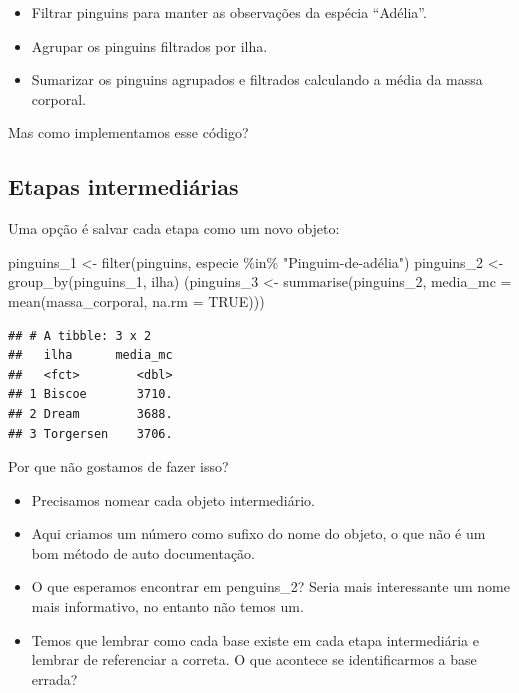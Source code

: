 \documentclass[
]{book}
\newenvironment{Shaded}{\begin{snugshade}}{\end{snugshade}}
\newcommand{\AttributeTok}[1]{\textcolor[rgb]{0.77,0.63,0.00}{#1}}
\newcommand{\ConstantTok}[1]{\textcolor[rgb]{0.00,0.00,0.00}{#1}}
\newcommand{\FunctionTok}[1]{\textcolor[rgb]{0.00,0.00,0.00}{#1}}
\newcommand{\NormalTok}[1]{#1}
\newcommand{\OtherTok}[1]{\textcolor[rgb]{0.56,0.35,0.01}{#1}}
\newcommand{\SpecialCharTok}[1]{\textcolor[rgb]{0.00,0.00,0.00}{#1}}
\newcommand{\StringTok}[1]{\textcolor[rgb]{0.31,0.60,0.02}{#1}}
\providecommand{\tightlist}{%
  \setlength{\itemsep}{0pt}\setlength{\parskip}{0pt}}
\begin{document}
\begin{itemize}
\tightlist
\item
  Filtrar pinguins para manter as observações da espécia ``Adélia''.
\item
  Agrupar os pinguins filtrados por ilha.
\item
  Sumarizar os pinguins agrupados e filtrados calculando a média da massa
  corporal.
\end{itemize}

Mas como implementamos esse código?

\hypertarget{etapas-intermediuxe1rias}{%
\subsection{Etapas intermediárias}\label{etapas-intermediuxe1rias}}

Uma opção é salvar cada etapa como um novo objeto:

\begin{Shaded}
\begin{Highlighting}[]
\NormalTok{pinguins\_1 }\OtherTok{\textless{}{-}} \FunctionTok{filter}\NormalTok{(pinguins, especie }\SpecialCharTok{\%in\%} \StringTok{"Pinguim{-}de{-}adélia"}\NormalTok{)}
\NormalTok{pinguins\_2 }\OtherTok{\textless{}{-}} \FunctionTok{group\_by}\NormalTok{(pinguins\_1, ilha)}
\NormalTok{(pinguins\_3 }\OtherTok{\textless{}{-}} \FunctionTok{summarise}\NormalTok{(pinguins\_2, }\AttributeTok{media\_mc =} \FunctionTok{mean}\NormalTok{(massa\_corporal, }\AttributeTok{na.rm =} \ConstantTok{TRUE}\NormalTok{)))}
\end{Highlighting}
\end{Shaded}

\begin{verbatim}
## # A tibble: 3 x 2
##   ilha      media_mc
##   <fct>        <dbl>
## 1 Biscoe       3710.
## 2 Dream        3688.
## 3 Torgersen    3706.
\end{verbatim}

Por que não gostamos de fazer isso?

\begin{itemize}
\tightlist
\item
  Precisamos nomear cada objeto intermediário.
\item
  Aqui criamos um número como sufixo do nome do objeto, o que não é um bom método de auto documentação.
\item
  O que esperamos encontrar em penguins\_2? Seria mais interessante um nome mais informativo, no entanto não temos um.
\item
  Temos que lembrar como cada base existe em cada etapa intermediária e lembrar de referenciar a correta. O que acontece se identificarmos a base errada?
\end{itemize}
\end{document}
